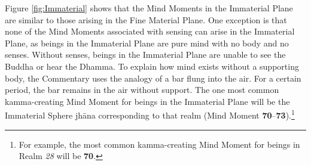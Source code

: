 Figure \ref{fig:Immaterial} shows that the Mind Moments in the Immaterial Plane are similar to those arising in the Fine Material Plane. One exception is that none of the Mind Moments associated with sensing can arise in the Immaterial Plane, as beings in the Immaterial Plane are pure mind with no body and no senses. Without senses, beings in the Immaterial Plane are unable to see the Buddha or hear the Dhamma. To explain how mind exists without a supporting body, the Commentary uses the analogy of a bar flung into the air. For a certain period, the bar remains in the air without support. The one most common kamma-creating Mind Moment for beings in the Immaterial Plane will be the Immaterial Sphere jhāna corresponding to that realm (Mind Moment \textbf{70}--\textbf{73}).\footnote{For example, the most common kamma-creating Mind Moment for beings in Realm \textit{28} will be \textbf{70}.}

